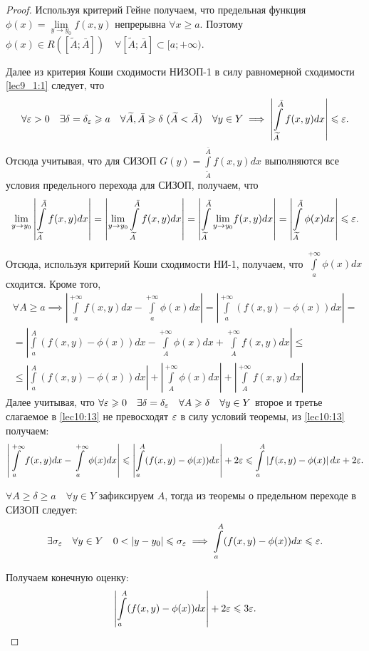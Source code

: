 \documentclass[../../main.tex]{subfiles}
\begin{document}
\begin{proof}
Используя критерий Гейне получаем, что предельная функция ${\phi(x) 
=\underset{y \to y_0}{\lim}f(x,y)}$ непрерывна $\forall x \ge a$. Поэтому 
$\phi(x) \in R([\widetilde{A};\bar{A}])\quad \forall [\widetilde{A};\bar{A}] 
\subset 
[a;+\infty) $.

Далее из критерия Коши сходимости НИЗОП-1 в силу равномерной сходимости 
\eqref{lec9_1:1} следует, что \[\forall \varepsilon > 0\quad \exists \delta = 
\delta_\varepsilon 
\geqslant a\quad \forall \widetilde{A},\bar {A} \geqslant \delta \ (\widetilde{A} < 
\bar{A}) \quad
\forall y 
\in Y \implies \left| \int\limits_{\widetilde{A}}^{\bar{A}}f(x,y)dx \right| 
\leqslant 
\varepsilon. \]
Отсюда учитывая, что для СИЗОП 
$G(y)=\int\limits_{\widetilde{A}}^{\bar{A}}f(x,y)dx$ выполняются все условия 
предельного перехода для СИЗОП,
получаем, что \[\underset{y \to y_0}\lim  \left| 
\int\limits_{\widetilde{A}}^{\bar{A}}f(x,y)dx  \right| = \left| \underset{y 
\to 
y_0}\lim \int\limits_{\widetilde{A}}^{\bar{A}}f(x,y)dx  \right| = \left| 
\int\limits_{\widetilde{A}}^{\bar{A}}  \underset{y \to y_0}\lim f(x,y)dx  
\right| 
= \left| \int\limits_{\widetilde{A}}^{\bar{A}}\phi(x)dx \right| \leqslant \varepsilon 
.\]

Отсюда, используя критерий Коши сходимости НИ-1, получаем, что 
$\int\limits_a^{+\infty}\phi(x)dx$ сходится.
Кроме того, \begin{equation}
\begin{gathered}
\label{lec10:13}  \forall A \ge a \implies 
\left|\int\limits_{a}^{+\infty}f(x,y)dx  
-\int\limits_{a}^{+\infty}\phi(x)dx \right| = 
\left|\int\limits_{a}^{+\infty}(f(x,y) - \phi(x))dx \right| = \\ =
\left|\int\limits_{a}^{A}(f(x,y) - \phi(x))dx - 
\int\limits_{A}^{+\infty}\phi(x)dx + 
\int\limits_{A}^{+\infty}f(x,y)dx\right| \le\\\le \left| 
\int\limits_{a}^{A}(f(x,y) 
- \phi(x))dx \right| + \left|\int\limits_{A}^{+\infty}\phi(x)dx \right| 
+ \left| \int\limits_{A}^{+\infty}f(x,y)dx\right|
\end{gathered}
\end{equation}
Далее учитывая, что $\forall \varepsilon \geqslant 0 \quad \exists \delta = \delta_\varepsilon 
\quad \forall 
A \geqslant \delta \quad \forall y \in Y  $ второе и третье слагаемое в 
\eqref{lec10:13}
не превосходят $\varepsilon$ в силу условий теоремы,
из \eqref{lec10:13} получаем: \[ \left| \int\limits_{a}^{+\infty}f(x,y)dx - 
\int\limits_{a}^{+\infty}\phi(x)dx\right| \leqslant \left| 
\int\limits_{a}^{A}(f(x,y) - \phi(x))dx \right| + 2\varepsilon \leqslant 
\int\limits_{a}^{A}\left| f(x,y) - \phi(x)\right|dx + 2\varepsilon  .\]

$ \forall A \ge \delta \ge a \quad \forall y \in Y$ зафиксируем $A$, тогда из 
теоремы о предельном переходе в СИЗОП следует: \[ \exists \sigma_\varepsilon \quad 
\forall y 
\in Y \quad 0 < \left|y - y_0 \right| \leqslant \sigma_\varepsilon \implies 
\int\limits_{a}^{A}(f(x,y) - \phi(x))dx \leqslant \varepsilon .\]

Получаем конечную оценку: \[\left| \int\limits_{a}^{A}(f(x,y) - \phi(x))dx 
\right| + 2\varepsilon \leqslant 3\varepsilon. \qedhere\]
\end{proof}
\end{document}
